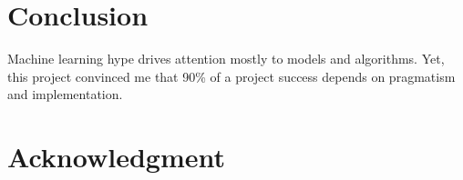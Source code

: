\chapter*{Conclusion} %
\label{cha:conclusion}


Machine learning hype drives attention mostly to models and algorithms. Yet, this project convinced me that 90\% of a project success depends on pragmatism and implementation.


\chapter*{Acknowledgment}

